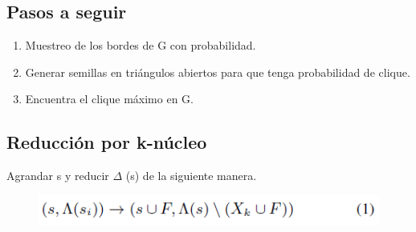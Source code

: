 \subsection{Pasos a seguir}
\begin{enumerate}
    \item Muestreo de los bordes de G con probabilidad.
    \item Generar semillas en triángulos abiertos para que tenga probabilidad de clique.
    \item Encuentra el clique máximo en G.
\end{enumerate}

\subsection{Reducción por k-núcleo}
Agrandar s y reducir \begin{math}\Delta\end{math} (s) de la siguiente manera.

\begin{figure}[h!]
\centering
\includegraphics[scale=1]{img/imagen7.png}
\label{Comandos}
\end{figure}

